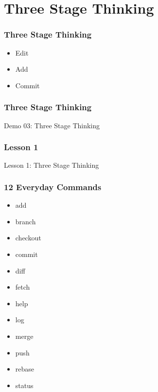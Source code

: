 \section[Section]{Three Stage Thinking}

\begin{frame}
    \frametitle{Three Stage Thinking}
    \begin{itemize}
        \setlength\itemsep{3em}
        \item Edit
        \item Add
        \item Commit
    \end{itemize}
\end{frame}

\begin{frame}
    \frametitle{Three Stage Thinking}
    \alert{Demo 03}: Three Stage Thinking
\end{frame}

\begin{frame}
    \frametitle{Lesson 1}
    \alert{Lesson 1}: Three Stage Thinking
\end{frame}

\begin{frame}
    \frametitle{12 Everyday Commands}
    \begin{multicols}{3}
        \begin{itemize}
            \setlength\itemsep{3em}
            \item \alert{add}
            \item branch
            \item checkout
            \item \alert{commit}
            \item \alert{diff}
            \item fetch
            \item \alert{help}
            \item \alert{log}
            \item merge
            \item push
            \item rebase
            \item \alert{status}
        \end{itemize}
    \end{multicols}
\end{frame}
